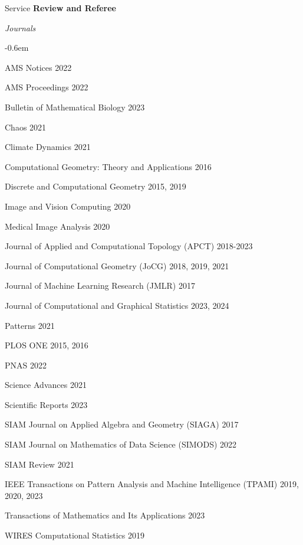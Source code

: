 \documentclass{resume} %
\begin{document}
\begin{rSection}{Service}
\textbf{Review and Referee}

\textit{Journals}
\begin{list}{}{\leftmargin=1em}
   \itemsep -0.6em \vspace{-0.5em} %
   \item AMS Notices \hfill 2022
   \item AMS Proceedings \hfill 2022
   \item Bulletin of Mathematical Biology \hfill 2023
   \item Chaos \hfill 2021
   \item Climate Dynamics \hfill 2021
   \item Computational Geometry: Theory and Applications \hfill 2016
   \item Discrete and Computational Geometry \hfill 2015, 2019
   \item Image and Vision Computing \hfill 2020
   \item Medical Image Analysis \hfill 2020
   \item Journal of Applied and Computational Topology (APCT) \hfill
   2018-2023
   \item Journal of Computational Geometry (JoCG) \hfill 2018, 2019, 2021
   \item Journal of Machine Learning Research (JMLR) \hfill 2017
   \item  Journal of Computational and Graphical Statistics \hfill 2023, 2024
   \item Patterns \hfill 2021
   \item PLOS ONE \hfill 2015, 2016
   \item PNAS \hfill 2022
   \item Science Advances \hfill 2021
   \item Scientific Reports \hfill 2023
   \item SIAM Journal on Applied Algebra and Geometry (SIAGA) \hfill 2017
   \item SIAM Journal on Mathematics of Data Science (SIMODS) \hfill 2022
   \item SIAM Review \hfill 2021
   \item IEEE Transactions on Pattern Analysis and Machine Intelligence (TPAMI) \hfill 2019, 2020, 2023
   \item Transactions of Mathematics and Its Applications
\hfill 2023
   \item WIRES Computational Statistics \hfill 2019

\end{list}
\end{rSection}
\end{document}
